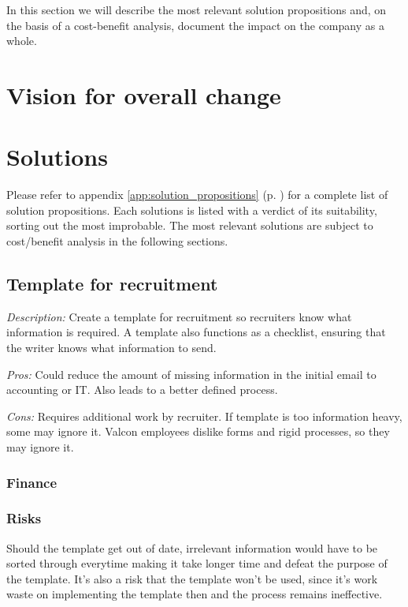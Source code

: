 In this section we will describe the most relevant solution propositions and, on the basis of a cost-benefit analysis, document the impact on the company as a whole.

\section{Vision for overall change}


\section{Solutions}
Please refer to appendix \ref{app:solution_propositions} (p. \pageref{app:solution_propositions}) for a complete list of solution propositions. Each solutions is listed with a verdict of its suitability, sorting out the most improbable.
The most relevant solutions are subject to cost/benefit analysis in the following sections.

\subsection{Template for recruitment}
\emph{Description:} Create a template for recruitment so recruiters know what information is required. A template also functions as a checklist, ensuring that the writer knows what information to send.

\emph{Pros:} Could reduce the amount of missing information in the initial email to accounting or IT. 
Also leads to a better defined process.

\emph{Cons:} Requires additional work by recruiter. 
If template is too information heavy, some may ignore it.
Valcon employees dislike forms and rigid processes, so they may ignore it.

\subsubsection{Finance}

\subsubsection{Risks}
Should the template get out of date, irrelevant information would have to be sorted through everytime making it take longer time and defeat the purpose of the template. 
It's also a risk that the template won't be used, since it's work waste on implementing the template then and the process remains ineffective.

